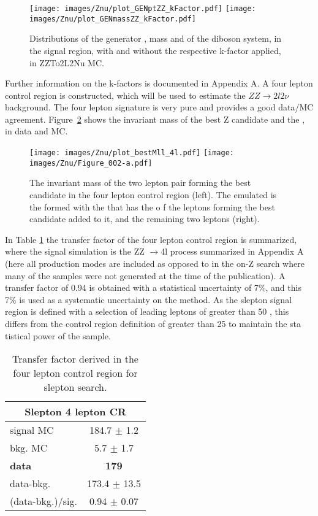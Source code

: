 \begin{figure}[htbp!]
\begin{center}
\texttt{[image: images/Znu/plot\_GENptZZ\_kFactor.pdf]}
\texttt{[image: images/Znu/plot\_GENmassZZ\_kFactor.pdf]}
\caption{Distributions of the generator \pt, mass and \dphi of the diboson system, in the signal region, with and without the respective k-factor applied, in ZZTo2L2Nu MC.}
\label{kfactor}
\end{center}
\end{figure}
Further information on the k-factors is documented in Appendix A.
A four lepton control region is constructed, which will be used to estimate the $ZZ\rightarrow 2l2\nu$ background. The four lepton signature is very pure and provides a good data/MC agreement.
Figure~\ref{fig:ZZslepton} shows the invariant mass of the best Z candidate and the \mttwo, in data and MC.
\begin{figure}[htbp!]
\begin{center}
\texttt{[image: images/Znu/plot\_bestMll\_4l.pdf]}
\texttt{[image: images/Znu/Figure\_002-a.pdf]}
\caption{The invariant mass of the two lepton pair forming the best \PZ candidate in the four lepton control region (left). The emulated \mttwo is the \mttwo formed with the \ptmiss that has the \pt o    f the leptons forming the best \PZ candidate added to it, and the remaining two leptons (right).}
\label{fig:ZZslepton}
\end{center}
\end{figure}
In Table \ref{tab:tab4lcontrol} the transfer factor of the four lepton control region is summarized, where the signal simulation is the ZZ $\rightarrow$4l process summarized in Appendix A (here all production modes are included as opposed to in the on-Z search where many of the samples were not generated at the time of the publication).
A transfer factor of 0.94 is obtained with a statistical uncertainty of 7\%, and this 7\% is used as a systematic uncertainty on the method. 
As the slepton signal region is defined with a selection of leading leptons of \pt greater than 50 \GeV, this differs from the control region definition of \pt greater than 25 \GeV to maintain the sta    tistical power of the sample. 
\begin{table}[ht!]
\def\arraystretch{1.2}
\setlength{\belowcaptionskip}{6pt}
\small                
\centering                        
\caption{Transfer factor derived in the four lepton control region for slepton search.}
\label{tab:tab4lcontrol}          
\begin{tabular}{l c }
\hline \hline
\multicolumn{2}{c}{Slepton 4 lepton CR}  \\\hline
signal MC        & 184.7     $\pm$  1.2    \\
bkg. MC          & 5.7  $\pm$  1.7\\ \hline
\textbf{data}       & \textbf{179}  \\
data-bkg.        &  173.4   $\pm$  13.5 \\ \hline
(data-bkg.)/sig. & 0.94   $\pm$  0.07\\\hline\hline
\end{tabular}    
\end{table}

